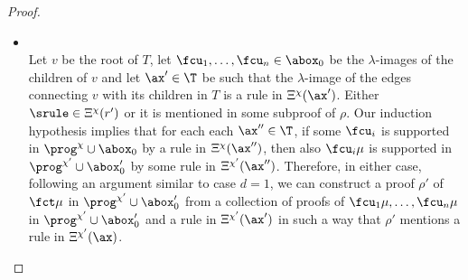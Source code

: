 \begin{proof}
\begin{itemize}
\begin{itemize}
      \item  $\bigwedge_{i=1^n}\fcu'_i \to \bot$ if $m=0$ 	\\
	Then it must be $\fct = \bot$ and, as in the previous case,
        the $\lambda$-images of the leaves of $T$ must be
        $\fcu_1,\dots,\fcu_n \in \abox_0$ such that there exists a MGU
        $\s$ of $\fcu_i, \fcu'_i$ for every $1\leq i \leq n$.
	Also, $\fcu_i\mu\in\abox'_0$ for every $1\leq i \leq n$, $\srule \in \Xi^{\chi'}(\ax)$, and 
	$\s' = \s\mu$ is a MGU of $\fcu_i\mu, \fcu'_i$ for every $1\leq i \leq n$, so we have a proof of 
	$\fct\mu = \bot$ in $\prog^{\chi'}\cup\abox_0'$ supported by $\srule\in\Xi^{\chi'}(\ax)$.
	\end{itemize}

      \item [$d>1$]\ \\
	Let $v$ be the root of $T$, let $\fcu_1,\dots,\fcu_n \in
        \abox_0$ be the $\lambda$-images of the children of $v$ and
        let $\ax'\in\T$ be such that the $\lambda$-image of the
        edges connecting $v$ with its children in $T$ is a rule in
        $\Xi^{\chi}(\ax')$.  Either $\srule\in\Xi^{\chi}(r')$ or it is
        mentioned in some subproof of $\rho$.  Our induction
        hypothesis implies that for each each $\ax''\in\T$, if some
        $\fcu_i$ is supported in $\prog^{\chi}\cup\abox_0$ by a rule
        in $\Xi^{\chi}(\ax'')$, then also $\fcu_i\mu$ is supported in
        $\prog^{\chi'}\cup\abox'_0$ by some rule in
        $\Xi^{\chi'}(\ax'')$.  Therefore, in either case, following an
        argument similar to case $d=1$, we can construct a proof
        $\rho'$ of $\fct\mu$ in $\prog^{\chi'}\cup\abox'_0$ from a
        collection of proofs of $\fcu_1\mu, \dots, \fcu_n\mu$ in
        $\prog^{\chi'}\cup\abox'_0$ and a rule in $\Xi^{\chi'}(\ax')$
        in such a way that $\rho'$ mentions a rule in
        $\Xi^{\chi'}(\ax)$.\qedhere
\end{itemize}
\end{proof}

